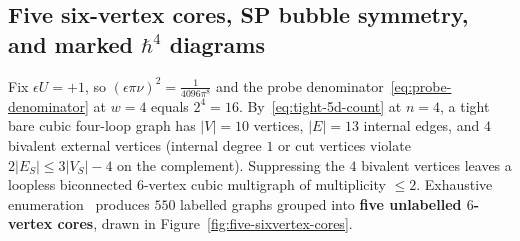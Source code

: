 \documentclass[11pt,letterpaper]{article}
\numberwithin{equation}{section}
\theoremstyle{plain}
\theoremstyle{definition}
\theoremstyle{remark}
\begin{document}
\subsection{Five six-vertex cores, SP bubble symmetry, and marked $\hbar^4$ diagrams}
\label{subsec:fourloop-cores}

Fix $\epsilon U = +1$, so $(\epsilon\pi\nu)^2 = \frac{1}{4096\pi^8}$ and the probe denominator~\eqref{eq:probe-denominator} at $w = 4$ equals $2^4 = 16$. By~\eqref{eq:tight-5d-count} at $n = 4$, a tight bare cubic four-loop graph has $|V| = 10$ vertices, $|E| = 13$ internal edges, and $4$ bivalent external vertices (internal degree $1$ or cut vertices violate $2|E_S|\le 3|V_S|-4$ on the complement). Suppressing the $4$ bivalent vertices leaves a loopless biconnected $6$-vertex cubic multigraph of multiplicity $\le 2$. Exhaustive enumeration~\cite[\S6.2]{RepoAllOrders} produces $550$ labelled graphs grouped into \textbf{five unlabelled $6$-vertex cores}, drawn in Figure~\ref{fig:five-sixvertex-cores}.
\end{document}
